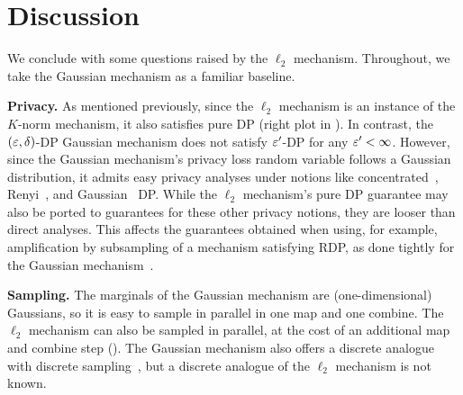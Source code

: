 \section{Discussion}
\label{sec:discussion}
We conclude with some questions raised by the $\ell_2$ mechanism. Throughout, we take the Gaussian mechanism as a familiar baseline.

\textbf{Privacy.} As mentioned previously, since the $\ell_2$ mechanism is an instance of the $K$-norm mechanism, it also satisfies pure DP (right plot in ). In contrast, the $(\varepsilon, \delta)$-DP Gaussian mechanism does not satisfy $\varepsilon'$-DP for any $\varepsilon' < \infty$. However, since the Gaussian mechanism's privacy loss random variable follows a Gaussian distribution, it admits easy privacy analyses under notions like concentrated~\cite{BS16}, Renyi~\cite{M17}, and Gaussian~\cite{DRS22} DP. While the $\ell_2$ mechanism's pure DP guarantee may also be ported to guarantees for these other privacy notions, they are looser than direct analyses. This affects the guarantees obtained when using, for example, amplification by subsampling of a mechanism satisfying RDP, as done tightly for the Gaussian mechanism~\cite{ACGMM+16, WBK19}.

\textbf{Sampling.} The marginals of the Gaussian mechanism are (one-dimensional) Gaussians, so it is easy to sample in parallel in one map and one combine. The $\ell_2$ mechanism can also be sampled in parallel, at the cost of an additional map and combine step (). The Gaussian mechanism also offers a discrete analogue with discrete sampling~\cite{CKS20}, but a discrete analogue of the $\ell_2$ mechanism is not known.